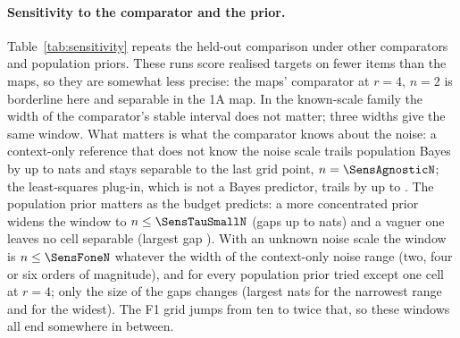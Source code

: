 \paragraph{Sensitivity to the comparator and the prior.} Table~\ref{tab:sensitivity} repeats the held-out comparison under
other comparators and population priors. These runs score realised targets on fewer items than the maps, so they are somewhat
less precise: the maps' comparator at $r=4$, $n=2$ is borderline here and separable in the 1A map. In the known-scale family
the width of the comparator's stable interval does not matter; three widths give the same window. What matters is what the
comparator knows about the noise: a context-only reference that does not know the noise scale trails population Bayes by up
to \SensAgnosticMax nats and stays separable to the last grid point, $n=\SensAgnosticN$; the least-squares plug-in, which is
not a Bayes predictor, trails by up to \SensOlsMax. The population prior matters as the budget predicts: a more concentrated
prior widens the window to $n\le\SensTauSmallN$ (gaps up to \SensTauSmallMax nats) and a vaguer one leaves no cell separable
(largest gap \SensTauLargeMax). With an unknown noise scale the window is $n\le\SensFoneN$ whatever the width of the
context-only noise range (two, four or six orders of magnitude), and for every population prior tried except one cell at
$r=4$; only the size of the gaps changes (largest \SensFoneNarrowMax nats for the narrowest range and \SensFoneWideMax for the
widest). The F1 grid jumps from ten to twice that, so these windows all end somewhere in between.

\begin{table}[t]
\centering\scriptsize

\caption{Held-out population versus context-only Bayes, $h=1$, under other comparators, other population priors and, for the
noisy family, ten times the sample size: largest separable $n$ per $r$ (``--'': none; $^*$: last grid point) and, in
parentheses, the largest gap in nats. Rows marked ``the maps'' repeat the maps' choice. Generated from the pinned results
file.}
\label{tab:sensitivity}
\end{table}

